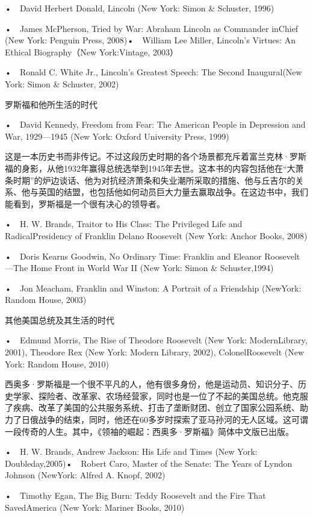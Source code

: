 •　David Herbert Donald, Lincoln (New York: Simon \& Schuster, 1996)

•　James McPherson, Tried by War: Abraham Lincoln as Commander inChief (New York: Penguin Press, 2008)•　William Lee Miller, Lincoln’s Virtues: An Ethical Biography（New York:Vintage, 2003）

•　Ronald C. White Jr., Lincoln’s Greatest Speech: The Second Inaugural(New York: Simon \& Schuster, 2002)


罗斯福和他所生活的时代

•　David Kennedy, Freedom from Fear: The American People in Depression and War, 1929—1945 (New York: Oxford University Press, 1999)

这是一本历史书而非传记。不过这段历史时期的各个场景都充斥着富兰克林·罗斯福的身影，从他1932年赢得总统选举到1945年去世。这本书的内容包括他在“大萧条时期”的炉边谈话、他为对抗经济萧条和失业潮所采取的措施、他与丘吉尔的关系、他与英国的结盟，也包括他如何动员巨大力量去赢取战争。在这边书中，我们能看到，罗斯福是一个很有决心的领导者。

•　H. W. Brands, Traitor to His Class: The Privileged Life and RadicalPresidency of Franklin Delano Roosevelt (New York: Anchor Books, 2008)

•　Doris Kearns Goodwin, No Ordinary Time: Franklin and Eleanor Roosevelt—The Home Front in World War II (New York: Simon \& Schuster,1994)

•　Jon Meacham, Franklin and Winston: A Portrait of a Friendship (NewYork: Random House, 2003)

其他美国总统及其生活的时代

•　Edmund Morris, The Rise of Theodore Roosevelt (New York: ModernLibrary, 2001), Theodore Rex (New York: Modern Library, 2002), ColonelRoosevelt (New York: Random House, 2010)

西奥多·罗斯福是一个很不平凡的人，他有很多身份，他是运动员、知识分子、历史学家、探险者、改革家、农场经营家，同时也是一位了不起的美国总统。他克服了疾病、改革了美国的公共服务系统、打击了垄断财团、创立了国家公园系统、助力了日俄战争的结束，同时，他还在60多岁时探索了亚马孙河的无人区域。这可谓一段传奇的人生。其中，《领袖的崛起：西奥多·罗斯福》简体中文版已出版。

•　H. W. Brands, Andrew Jackson: His Life and Times (New York: Doubleday,2005)•　Robert Caro, Master of the Senate: The Years of Lyndon Johnson (NewYork: Alfred A. Knopf, 2002)

•　Timothy Egan, The Big Burn: Teddy Roosevelt and the Fire That SavedAmerica (New York: Mariner Books, 2010)

